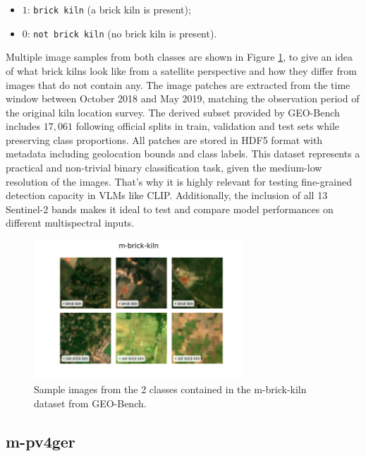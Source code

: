 \documentclass[a4paper, twoside, english]{sapthesis} %
\begin{document}
\begin{itemize}
    \item $1$: \texttt{brick kiln} (a brick kiln is present);
    \item $0$: \texttt{not brick kiln} (no brick kiln is present).
\end{itemize}

Multiple image samples from both classes are shown in Figure \ref{fig:brickgrid}, to give an idea of what brick kilns look like from a satellite perspective and how they differ from images that do not contain any. The image patches are extracted from the time window between October 2018 and May 2019, matching the observation period of the original kiln location survey. The derived subset provided by GEO-Bench includes $17,061$ following official splits in train, validation and test sets while preserving class proportions. All patches are stored in HDF5 format with metadata including geolocation bounds and class labels.
This dataset represents a practical and non-trivial binary classification task, given the medium-low resolution of the images. That's why it is highly relevant for testing fine-grained detection capacity in VLMs like CLIP. Additionally, the inclusion of all 13 Sentinel-2 bands makes it ideal to test and compare model performances on different multispectral inputs.

\begin{figure}[h]
    \centering
    \includegraphics[width=0.7\textwidth]{img/m-brick-kiln_image_grid.png}
    \vspace{-0.5cm}
    \caption{\normalsize Sample images from the 2 classes contained in the m-brick-kiln dataset from GEO-Bench.}
    \label{fig:brickgrid}
\end{figure}


\subsection{m-pv4ger}
\end{document}
